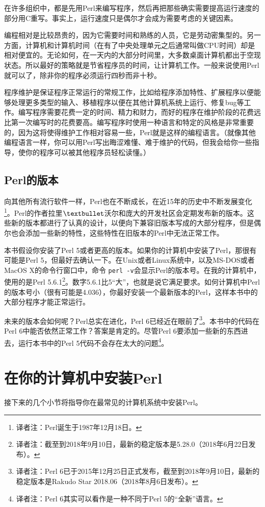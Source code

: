 在许多组织中，都是先用Perl来编写程序，然后再把那些确实需要提高运行速度的部分用C重写。事实上，运行速度只是偶尔才会成为需要考虑的关键因素。

编程相对是比较昂贵的，因为它需要时间和熟练的人员，它是劳动密集型的。另一方面，计算机和计算机时间（在有了中央处理单元之后通常叫做CPU时间）却是相对便宜的。无论如何，在一天内的大部分时间里，大多数桌面计算机都出于空现状态。所以最好的策略就是节省程序员的时间，让计算机工作。一般来说使用Perl就可以了，除非你的程序必须运行四秒而非十秒。

程序维护是保证程序正常运行的常规工作，比如给程序添加特性、扩展程序以便能够处理更多类型的输入、移植程序以便在其他计算机系统上运行、修复bug等工作。编写程序需要花费一定的时间、精力和财力，而好的程序在维护阶段的花费远比第一次编写时的花费要高。编写程序时使用一种语言和特定的风格是非常重要的，因为这将使得维护工作相对容易一些，Perl就是这样的编程语言。（就像其他编程语言一样，你可以用Perl写出晦涩难懂、难于维护的代码，但我会给你一些指导，使你的程序可以被其他程序员轻松读懂。）

\subsection{Perl的版本}
向其他所有流行软件一样，Perl也在不断成长，在近15年的历史中不断发展变化\footnote{译者注：Perl诞生于1987年12月18日。}。Perl的作者拉里$\textbullet$沃尔和庞大的开发社区会定期发布新的版本。这些新的版本都进行了认真的设计，以便向下兼容旧版本写成的大部分程序，但是偶尔也会添加一些新的特性，这些特性在旧版本的Perl中无法正常工作。

本书假设你安装了Perl 5或者更高的版本。如果你的计算机中安装了Perl，那很有可能是Perl 5，但最好去确认一下。在Unix或者Linux系统中，以及MS-DOS或者MacOS X的命令行窗口中，命令 \verb|perl -v|会显示Perl的版本号。在我的计算机中，使用的是Perl 5.6.1\footnote{译者注：截至到2018年9月10日，最新的稳定版本是5.28.0（2018年6月22日发布）。}。数字5.6.1比5“大”，也就是说它满足要求。如何计算机中Perl的版本号小（很有可能是4.036），你最好安装一个最新版本的Perl，这样本书中的大部分程序才能正常运行。

未来的版本会如何呢？Perl总实在进化，Perl 6已经近在眼前了\footnote{译者注：Perl 6已于2015年12月25日正式发布，截至到2018年9月10日，最新的稳定版本是Rakudo Star 2018.06（2018年8月6日发布）。}。本书中的代码在Perl 6中能否依然正常工作？答案是肯定的。尽管Perl 6要添加一些新的东西进去，运行本书中的Perl 5代码不会存在太大的问题\footnote{译者注：Perl 6其实可以看作是一种不同于Perl 5的“全新”语言。}。

\section{在你的计算机中安装Perl}
接下来的几个小节将指导你在最常见的计算机系统中安装Perl。

